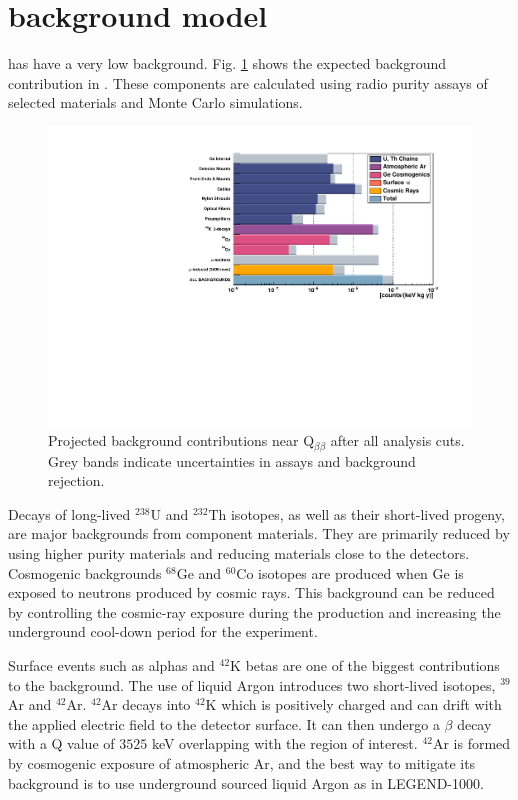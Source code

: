 

\section{{\Ltwo} background model}

{\Ltwo} has have a very low background. Fig. \ref{fig:L200_background} shows the expected background contribution in {\Ltwo}. These components are calculated using radio purity assays of selected materials and Monte Carlo simulations. 

\begin{figure}[!htb]
\centering
  \includegraphics[width=0.8\linewidth]{ch2/figs/L200_background.pdf}
  \caption{{\Ltwo} Projected background contributions near Q$_{\beta\beta}$ after all analysis cuts. Grey bands indicate uncertainties in assays and background rejection.}
\label{fig:L200_background}
  \end{figure}


  
Decays of long-lived $^{238}$U and $^{232}$Th isotopes, as well as their short-lived progeny, are major backgrounds from component materials. They are primarily reduced by using higher purity materials and reducing materials close to the detectors. Cosmogenic backgrounds $^{68}$Ge and $^{60}$Co isotopes are produced when Ge is exposed to neutrons produced by cosmic rays. This background can be reduced by controlling the cosmic-ray exposure during the production and increasing the underground cool-down period for the experiment. 

Surface events such as alphas and $^{42}$K betas are one of the biggest contributions to the background. The use of liquid Argon introduces two short-lived isotopes, $^{39}$Ar and $^{42}$Ar.  $^{42}$Ar decays into $^{42}$K which is positively charged and can drift with the applied electric field to the detector surface. It can then undergo a $\beta$ decay with a Q value of $3525$ keV overlapping with the region of interest. $^{42}$Ar is formed by cosmogenic exposure of atmospheric Ar, and the best way to mitigate its background is to use underground sourced liquid Argon as in LEGEND-1000.

